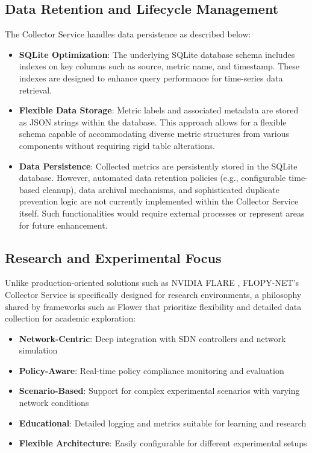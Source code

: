 \subsection{Data Retention and Lifecycle Management}

The Collector Service handles data persistence as described below:

\begin{itemize}
    \item \textbf{SQLite Optimization}: The underlying SQLite database schema includes indexes on key columns such as source, metric name, and timestamp. These indexes are designed to enhance query performance for time-series data retrieval.
    \item \textbf{Flexible Data Storage}: Metric labels and associated metadata are stored as JSON strings within the database. This approach allows for a flexible schema capable of accommodating diverse metric structures from various components without requiring rigid table alterations.
    \item \textbf{Data Persistence}: Collected metrics are persistently stored in the SQLite database. However, automated data retention policies (e.g., configurable time-based cleanup), data archival mechanisms, and sophisticated duplicate prevention logic are not currently implemented within the Collector Service itself. Such functionalities would require external processes or represent areas for future enhancement.
\end{itemize}

\subsection{Research and Experimental Focus}

Unlike production-oriented solutions such as NVIDIA FLARE \cite{nvidia2023flare}, FLOPY-NET's Collector Service is specifically designed for research environments, a philosophy shared by frameworks such as Flower \cite{beutel2020flower} that prioritize flexibility and detailed data collection for academic exploration:

\begin{itemize}
    \item \textbf{Network-Centric}: Deep integration with SDN controllers and network simulation
    \item \textbf{Policy-Aware}: Real-time policy compliance monitoring and evaluation
    \item \textbf{Scenario-Based}: Support for complex experimental scenarios with varying network conditions
    \item \textbf{Educational}: Detailed logging and metrics suitable for learning and research
    \item \textbf{Flexible Architecture}: Easily configurable for different experimental setups
\end{itemize}

